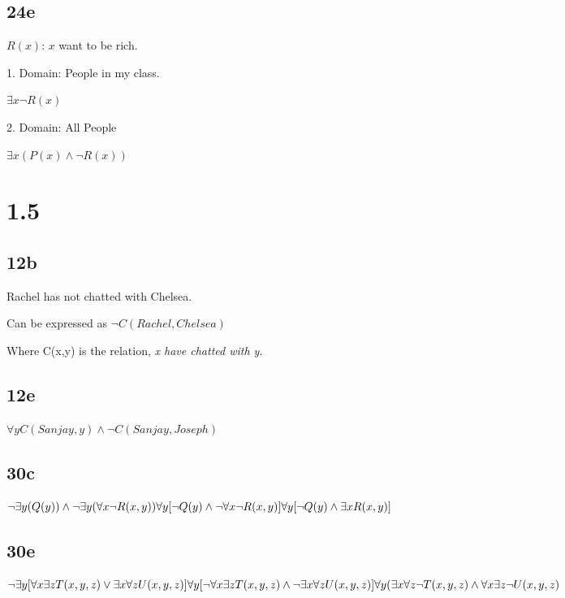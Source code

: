 \documentclass[12pt]{article}
\begin{document}
\subsection{24e}
$R(x)$: $x$ want to be rich.

1. Domain: People in my class.

$\exists{x} \neg R(x)$

2. Domain: All People

$\exists{x} (P(x) \wedge \neg R(x))$

\section{1.5}
\subsection{12b}
Rachel has not chatted with Chelsea.

Can be expressed as
\begin{math}
  \neg C(Rachel,Chelsea)
\end{math}

Where C(x,y) is the relation, \emph{x have chatted with y}.

\subsection{12e}

\begin{math}
  \forall{y} C(Sanjay, y) \wedge \neg C(Sanjay,Joseph)
\end{math}

\subsection{30c}

\begin{math}
  \neg \exists{y}(Q(y)) \wedge \neg \exists{y} (\forall{x}\neg R(x,y)) \newline
  \forall{y}[\neg Q(y) \wedge \neg \forall{x} \neg R(x,y)]\newline
  \forall{y}[\neg Q(y) \wedge \exists{x} R(x,y)]
\end{math}

\subsection{30e}
\begin{math}
  \neg \exists{y}[\forall{x}\exists{z}T(x,y,z)\vee \exists{x}\forall{z}U(x,y,z)] \newline
  \forall{y} [\neg\forall{x}\exists{z}T(x,y,z)\wedge \neg \exists{x}\forall{z}U(x,y,z)] \newline
  \forall{y}(\exists{x}\forall{z} \neg T(x,y,z) \wedge \forall{x}\exists{z}\neg U(x,y,z)
\end{math}
\end{document}
